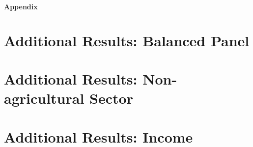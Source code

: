\documentclass[12pt]{article}
\begin{document}
\newpage
% 


\newpage
\appendix
\onehalfspacing


\renewcommand\thefigure{\thesection.\arabic{figure}}
\setcounter{figure}{0}

\renewcommand\thetable{\thesection.\arabic{table}}
\setcounter{table}{0}
\begin{center}\textbf{\huge{Appendix}}\end{center}







\section{Additional Results: Balanced Panel}\label{app:balanced_panel}




\begin{landscape}
     
\end{landscape}
% 
% 
% 


\section{Additional Results: Non-agricultural Sector}\label{app:nonag}

\begin{landscape}
     
\end{landscape}



\section{Additional Results: Income}\label{app:income}
\begin{landscape}
     
\end{landscape}




\end{document}
